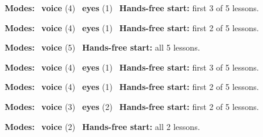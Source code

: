 \expandafter\def\csname hlchaptermodality393\endcsname{%
  {\small\noindent
    \textbf{Modes:} \hlvoicesign{}~\textbf{voice} (4) \quad \hlsightsign{}~\textbf{eyes} (1)\quad
    \hlvoicesign{}~\textbf{Hands-free start:} first 3 of 5 lessons.%
    \par}\medskip
}

\expandafter\def\csname hlchaptermodality394\endcsname{%
  {\small\noindent
    \textbf{Modes:} \hlvoicesign{}~\textbf{voice} (4) \quad \hlsightsign{}~\textbf{eyes} (1)\quad
    \hlvoicesign{}~\textbf{Hands-free start:} first 2 of 5 lessons.%
    \par}\medskip
}

\expandafter\def\csname hlchaptermodality395\endcsname{%
  {\small\noindent
    \textbf{Modes:} \hlvoicesign{}~\textbf{voice} (5)\quad
    \hlvoicesign{}~\textbf{Hands-free start:} all 5 lessons.%
    \par}\medskip
}

\expandafter\def\csname hlchaptermodality396\endcsname{%
  {\small\noindent
    \textbf{Modes:} \hlvoicesign{}~\textbf{voice} (4) \quad \hlsightsign{}~\textbf{eyes} (1)\quad
    \hlvoicesign{}~\textbf{Hands-free start:} first 3 of 5 lessons.%
    \par}\medskip
}

\expandafter\def\csname hlchaptermodality397\endcsname{%
  {\small\noindent
    \textbf{Modes:} \hlvoicesign{}~\textbf{voice} (4) \quad \hlsightsign{}~\textbf{eyes} (1)\quad
    \hlvoicesign{}~\textbf{Hands-free start:} first 2 of 5 lessons.%
    \par}\medskip
}

\expandafter\def\csname hlchaptermodality398\endcsname{%
  {\small\noindent
    \textbf{Modes:} \hlvoicesign{}~\textbf{voice} (3) \quad \hlsightsign{}~\textbf{eyes} (2)\quad
    \hlvoicesign{}~\textbf{Hands-free start:} first 2 of 5 lessons.%
    \par}\medskip
}

\expandafter\def\csname hlchaptermodality399\endcsname{%
  {\small\noindent
    \textbf{Modes:} \hlvoicesign{}~\textbf{voice} (2)\quad
    \hlvoicesign{}~\textbf{Hands-free start:} all 2 lessons.%
    \par}\medskip
}
